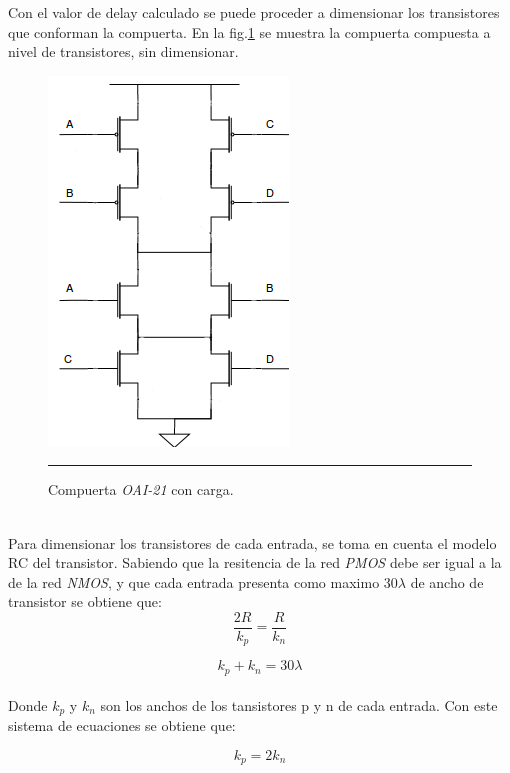 \documentclass[12pt,a4paper]{article} %
\begin{document}
Con el valor de delay calculado se puede proceder a dimensionar los transistores que conforman la compuerta. En la fig.\ref{fig:Comp_Transistores} se muestra la compuerta compuesta a nivel de transistores, sin dimensionar.\\

\begin{figure}[htbp]
  \centering
    \includegraphics[scale=0.5]{./Comp_Transistores.png}
    \rule{35em}{0.5pt}
  \caption[IdealvsSim]{Compuerta \textit{OAI-21} con carga.}
  \label{fig:Comp_Transistores}
\end{figure}\\

Para dimensionar los transistores de cada entrada, se toma en cuenta el modelo RC del transistor. Sabiendo que la resitencia de la red \textit{PMOS} debe ser igual a la de la red \textit{NMOS}, y que cada entrada presenta como maximo 30$\lambda$ de ancho de transistor se obtiene que:\\

\begin{equation}\label{eqn:R}
\frac{2R}{k_p} = \frac{R}{k_n}
\end{equation}

\begin{equation}\label{eqn:k}
k_p + k_n = 30\lambda
\end{equation}\\

Donde \textit{$k_{p}$} y \textit{$k_{n}$} son los anchos de los tansistores p y n de cada entrada. Con este sistema de ecuaciones se obtiene que:

\begin{equation}\label{eqn:R1}
k_p = 2k_n
\end{equation}
\end{document}
